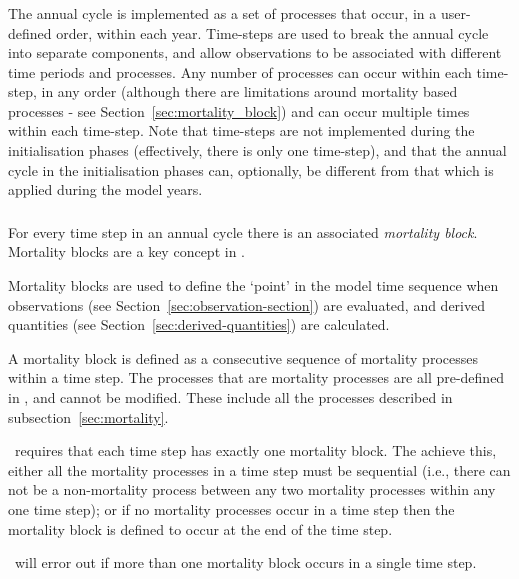 \subsubsection*{}

The annual cycle is implemented as a set of processes that occur, in a user-defined order, within each year. Time-steps are used to break the annual cycle into separate components, and allow observations to be associated with different time periods and processes. Any number of processes can occur within each time-step, in any order (although there are limitations around mortality based processes - see Section~\ref{sec:mortality_block}) and can occur multiple times within each time-step. Note that time-steps are not implemented during the initialisation phases (effectively, there is only one time-step), and that the annual cycle in the initialisation phases can, optionally, be different from that which is applied during the model years.

\subsubsection*{}\label{sec:mortality_block}

For every time step in an annual cycle there is an associated \emph{mortality block}. Mortality blocks are a key concept in \CNAME.

Mortality blocks are used to define the `point' in the model time sequence when observations (see Section~\ref{sec:observation-section}) are evaluated, and derived quantities (see Section~\ref{sec:derived-quantities}) are calculated.

A mortality block is defined as a consecutive sequence of mortality processes within a time step. The processes that are mortality processes are all pre-defined in \CNAME, and cannot be modified. These include all the processes described in subsection~\ref{sec:mortality}. 

\CNAME\ requires that each time step has exactly one mortality block. The achieve this, either all the mortality processes in a time step must be sequential (i.e., there can not be a non-mortality process between any two mortality processes within any one time step); or if no mortality processes occur in a time step then the mortality block is defined to occur at the end of the time step. 

\CNAME\ will error out if more than one mortality block occurs in a single time step. 

